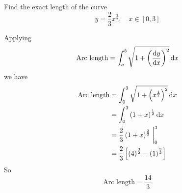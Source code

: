 \begin{exercise}
    Find the exact length of the curve 
    \[ y= \frac{2}{3} x^{\frac{3}{2}}, \quad x \in \left[ 0,3 \right] \]
\end{exercise}
\begin{solution}
    Applying 
    \[ \text{Arc length} = \int_{a }^{b} \sqrt{ 1 + \left( \dv{y }{x}  \right) ^{2}} \dd{x} \]
    we have 
    \begin{align*}
        \text{Arc length} &= \int_{0}^{3} \sqrt{1 + \left( x^{\frac{1}{2}} \right)^{2}} \dd{x} \\
        &= \int_{0}^{3} \left( 1+x \right)^{\frac{1}{2}} \dd{x} \\
        &= \frac{2}{3} \left( 1+x \right)^{\frac{3}{2}} \eval_{0}^{3} \\
        &=  \frac{2}{3} \left[ \left( 4 \right)^{\frac{3}{2}} - \left( 1 \right)^{\frac{3}{2}} \right]
    \end{align*}
So 
\[ \boxed{ \text{Arc length} = \frac{14}{3}} \]
\end{solution}

